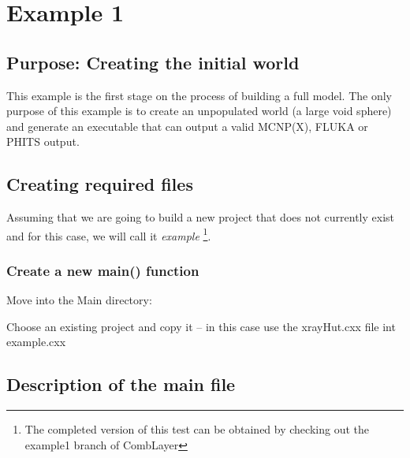 
\section{Example 1}

\subsection{Purpose: Creating the initial world}

This example is the first stage on the process of building a full model.
The only purpose of this example is to create an unpopulated world (a large
void sphere) and generate an executable that can output a valid MCNP(X),
FLUKA or PHITS output.

\subsection{Creating required files}

Assuming that we are going to build a new project that does not
currently exist and for this case, we will call it {\it example}
\footnote{The completed version of this test can be obtained by
checking out the example1 branch of CombLayer}.

\subsubsection{Create a new main() function}

Move into the Main directory:

Choose an existing project and copy it  --  in this case
use the xrayHut.cxx file int example.cxx

\subsection{Description of the main file}


